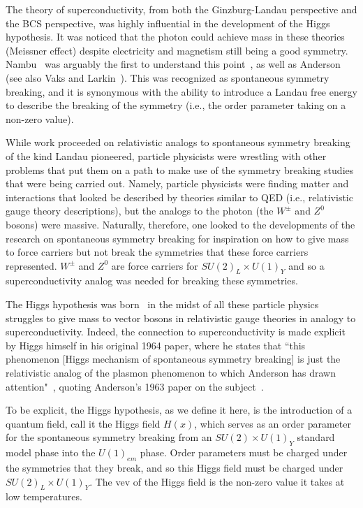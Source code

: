 \documentclass[letter,12pt]{article}
\begin{document}
The theory of superconductivity, from both the Ginzburg-Landau perspective and the BCS perspective, was highly influential in the development of the Higgs hypothesis. It was noticed that the photon could achieve mass in these theories (Meissner effect) despite electricity and magnetism still being a good symmetry. Nambu~\cite{Nambu:1960tm,Nambu:1961tp} was arguably the first to understand this point~\cite{Close:2013}, as well as Anderson~\cite{Anderson:1963} (see also Vaks and Larkin~\cite{Vaks:1960}). This was recognized as spontaneous symmetry breaking, and it is synonymous with the ability to introduce a Landau free energy to describe the breaking of the symmetry (i.e., the order parameter taking on a non-zero value).

While work proceeded on  relativistic analogs to spontaneous symmetry breaking of the kind Landau pioneered, particle physicists were wrestling with other problems that put them on a path to make use of the symmetry breaking studies that were being carried out. Namely, particle physicists were finding matter and interactions that looked be described by theories similar to QED (i.e., relativistic gauge theory descriptions), but the analogs to the photon (the $W^\pm$ and $Z^0$ bosons) were massive. Naturally, therefore, one looked to the developments  of the research on spontaneous symmetry breaking for inspiration on how to give mass to force carriers but not break the symmetries that these force carriers represented. $W^\pm$ and $Z^0$ are force carriers for $SU(2)_L\times U(1)_Y$ and so a superconductivity analog was needed for breaking these symmetries. 

The Higgs hypothesis was born~\cite{Higgs:1964ia,Higgs:1964pj,Englert:1964et,Guralnik:1964eu,Kibble:1967sv} in the midst of all these particle physics struggles to give mass to vector bosons in relativistic gauge theories in analogy to superconductivity.  Indeed, the connection to superconductivity is made explicit by Higgs himself in his original 1964 paper, where he states that ``this phenomenon [Higgs mechanism of spontaneous symmetry breaking] is just the relativistic analog of the plasmon phenomenon to which Anderson has drawn attention"~\cite{Higgs:1964pj}, quoting Anderson's 1963 paper on the subject~\cite{Anderson:1963}.

To be explicit, the Higgs hypothesis, as we define it here, is the introduction of a quantum field, call  it the Higgs field $H(x)$, which serves as an order parameter for the spontaneous symmetry breaking from an $SU(2)\times U(1)_Y$ standard model phase into the $U(1)_{em}$ phase. Order parameters must be charged under the symmetries that they break, and so this Higgs field must be charged under $SU(2)_L\times U(1)_Y$. The vev of the Higgs field is the non-zero value it takes at low temperatures. 
\end{document}
